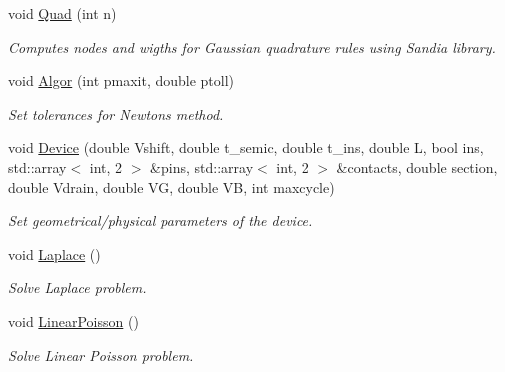 \begin{DoxyCompactItemize}
void \mbox{\hyperlink{class_probl_a20e64318e853ac58c258c4c1d20a2315}{Quad}} (int n)
\begin{DoxyCompactList}\small\item\em Computes nodes and wigths for Gaussian quadrature rules using Sandia library. \end{DoxyCompactList}\item 
\mbox{\label{class_probl_aef98437ee923d5ecc17e01bc85656522}} 
void \mbox{\hyperlink{class_probl_aef98437ee923d5ecc17e01bc85656522}{Algor}} (int pmaxit, double ptoll)
\begin{DoxyCompactList}\small\item\em Set tolerances for Newton\textquotesingle{}s method. \end{DoxyCompactList}\item 
\mbox{\label{class_probl_ada656c3096ea0ea167265f2dcf7aff45}} 
void \mbox{\hyperlink{class_probl_ada656c3096ea0ea167265f2dcf7aff45}{Device}} (double Vshift, double t\+\_\+semic, double t\+\_\+ins, double L, bool ins, std\+::array$<$ int, 2 $>$ \&pins, std\+::array$<$ int, 2 $>$ \&contacts, double section, double Vdrain, double VG, double VB, int maxcycle)
\begin{DoxyCompactList}\small\item\em Set geometrical/physical parameters of the device. \end{DoxyCompactList}\item 
\mbox{\label{class_probl_a07cc161806dfcce5e7cdf980b5e211c4}} 
void \mbox{\hyperlink{class_probl_a07cc161806dfcce5e7cdf980b5e211c4}{Laplace}} ()
\begin{DoxyCompactList}\small\item\em Solve Laplace problem. \end{DoxyCompactList}\item 
\mbox{\label{class_probl_a7ddf75d53dc3cd0ceaebad0e8b87c87c}} 
void \mbox{\hyperlink{class_probl_a7ddf75d53dc3cd0ceaebad0e8b87c87c}{Linear\+Poisson}} ()
\begin{DoxyCompactList}\small\item\em Solve Linear Poisson problem. \end{DoxyCompactList}\item 
\mbox{\label{class_probl_a1058c4e0191ea44dcbcd58426247b315}} 

\end{DoxyCompactItemize}
